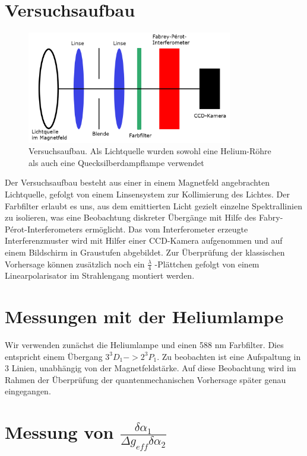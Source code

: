 \documentclass[bigchapter,colorback,accentcolor=tud4b,linedtoc,11pt]{tudreport}
\begin{document}
\section{Versuchsaufbau}
\begin{figure}[H] 
  \centering
     \includegraphics[width=0.8\textwidth]{img/aufbau.png}
     \caption{Versuchsaufbau. Als Lichtquelle wurden sowohl eine Helium-Röhre
       als auch eine Quecksilberdampflampe verwendet}
  \label{fig:aufbau}
\end{figure}

Der Versuchsaufbau besteht aus einer in einem Magnetfeld angebrachten
Lichtquelle, gefolgt von einem Linsensystem zur Kollimierung des Lichtes. Der
Farbfilter erlaubt es uns, aus dem emittierten Licht gezielt einzelne
Spektrallinien zu isolieren, was eine Beobachtung diskreter Übergänge mit Hilfe
des Fabry-Pérot-Interferometers ermöglicht. Das vom Interferometer erzeugte
Interferenzmuster wird mit Hilfer einer CCD-Kamera aufgenommen und auf einem
Bildschirm in Graustufen abgebildet. Zur Überprüfung der klassischen Vorhersage
können zusätzlich noch ein $\frac{\lambda}{4}$ -Plättchen gefolgt von einem
Linearpolarisator im Strahlengang montiert werden.

\section{Messungen mit der Heliumlampe}

Wir verwenden zunächst die Heliumlampe und einen 588 nm Farbfilter. Dies entspricht einem Übergang  $3^3 D_{1} -> 2^3 P_{1}$. Zu beobachten ist eine Aufspaltung in 3 Linien, unabhängig von der Magnetfeldstärke. Auf diese Beobachtung wird im Rahmen der Überprüfung der quantenmechanischen Vorhersage später genau eingegangen.

\section{Messung von $\frac{\delta\alpha_1}{\Delta g_{eff} \delta\alpha_2}$}
\end{document}

